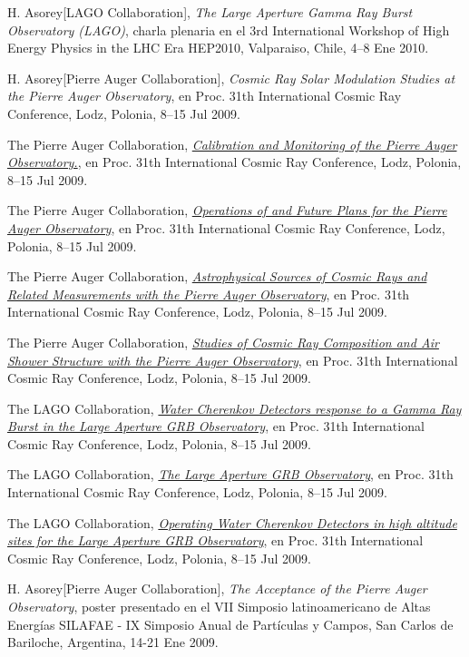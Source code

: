 \documentclass[11pt, a4paper]{article}
\newcommand{\years}[1]{\marginnote{\scriptsize #1}}
\begin{document}
\years{2010}H. Asorey[LAGO Collaboration], {\emph{The Large Aperture Gamma Ray Burst Observatory (LAGO)}}, charla plenaria en el 3rd International Workshop of High Energy Physics in the LHC Era HEP2010, Valparaiso, Chile, 4--8 Ene 2010.

\years{2009}H. Asorey[Pierre Auger Collaboration], {\emph{Cosmic Ray Solar Modulation Studies at the Pierre Auger Observatory}}, en Proc. 31th International Cosmic Ray Conference, Lodz, Polonia, 8--15 Jul 2009.

\years{2009}The Pierre Auger Collaboration, \href{http://arxiv.org/abs/0906.2358}{\emph{Calibration and Monitoring of the Pierre Auger Observatory.}}, en Proc. 31th International Cosmic Ray Conference, Lodz, Polonia, 8--15 Jul 2009.

\years{2009}The Pierre Auger Collaboration, \href{http://arxiv.org/abs/0906.2354}{\emph{Operations of and Future Plans for the Pierre Auger Observatory}}, en Proc. 31th International Cosmic Ray Conference, Lodz, Polonia, 8--15 Jul 2009.

\years{2009}The Pierre Auger Collaboration, \href{http://arxiv.org/abs/0906.2347}{\emph{Astrophysical Sources of Cosmic Rays and Related Measurements with the Pierre Auger Observatory}}, en Proc. 31th International Cosmic Ray Conference, Lodz, Polonia, 8--15 Jul 2009.

\years{2009}The Pierre Auger Collaboration, \href{http://arxiv.org/abs/0906.2319}{\emph{Studies of Cosmic Ray Composition and Air Shower Structure with the Pierre Auger Observatory}}, en Proc. 31th International Cosmic Ray Conference, Lodz, Polonia, 8--15 Jul 2009.

\years{2009}The LAGO Collaboration, \href{http://arxiv.org/abs/0906.0820}{\emph{Water Cherenkov Detectors response to a Gamma Ray Burst in the Large Aperture GRB Observatory}}, en Proc. 31th International Cosmic Ray Conference, Lodz, Polonia, 8--15 Jul 2009.

\years{2009}The LAGO Collaboration, \href{http://arxiv.org/abs/0906.0816}{\emph{The Large Aperture GRB Observatory}}, en Proc. 31th International Cosmic Ray Conference, Lodz, Polonia, 8--15 Jul 2009.

\years{2009}The LAGO Collaboration, \href{http://arxiv.org/abs/0906.0814}{\emph{Operating Water Cherenkov Detectors in high altitude sites for the Large Aperture GRB Observatory}}, en Proc. 31th International Cosmic Ray Conference, Lodz, Polonia, 8--15 Jul 2009.

\years{2009}H. Asorey[Pierre Auger Collaboration], {\emph{The Acceptance of the
Pierre Auger Observatory}}, poster presentado en el VII Simposio
latinoamericano de Altas Energías SILAFAE - IX Simposio Anual de Partículas y
Campos, San Carlos de Bariloche, Argentina, 14-21 Ene 2009.
\end{document}
